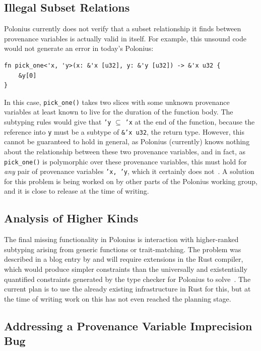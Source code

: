 \documentclass[11pt,a4paper,twoside,openany]{report}
\newcommand{\InRust}[1]{\texttt{#1}}
\renewcommand\_{\textunderscore\allowbreak}
\begin{document}
\subsection{Illegal Subset Relations}\label{sec:missing-features:illegal-subset-relations}

Polonius currently does not verify that a subset relationship it finds between
provenance variables is actually valid in itself. For example, this unsound code
would not generate an error in today's Polonius:
\begin{verbatim}
fn pick_one<'x, 'y>(x: &'x [u32], y: &'y [u32]) -> &'x u32 {
    &y[0]
}
\end{verbatim}

In this case, \InRust{pick_one()} takes two slices with some unknown provenance
variables at least known to live for the duration of the function body. The
subtyping rules would give that \InRust{'y} $\subseteq$ \InRust{'x} at the end
of the function, because the reference into \InRust{y} must be a subtype of
\InRust{&'x u32}, the return type. However, this cannot be guaranteed to hold in
general, as Polonius (currently) knows nothing about the relationship between
these two provenance variables, and in fact, as \InRust{pick_one()} is
polymorphic over these provenance variables, this must hold for \emph{any} pair
of provenance variables \InRust{'x, 'y}, which it certainly does
not~\cite{matsakis_polonius_2019-1}. A solution for this problem is being worked
on by other parts of the Polonius working group, and it is close to release at
the time of writing.

\subsection{Analysis of Higher Kinds}\label{sec:missing-features:higher-kinds}

The final missing functionality in Polonius is interaction with higher-ranked
subtyping arising from generic functions or trait-matching. The problem was
described in a blog entry by \citeauthor*{matsakis_polonius_2019} and will
require extensions in the Rust compiler, which would produce simpler constraints
than the universally and existentially quantified constraints generated by the
type checker for Polonius to solve~\cite{matsakis_polonius_2019}. The current
plan is to use the already existing infrastructure in Rust for this, but at the
time of writing work on this has not even reached the planning stage.

\subsection{Addressing a Provenance Variable Imprecision Bug}\label{sec:missing-features:provenance-variable-equality}
\end{document}
